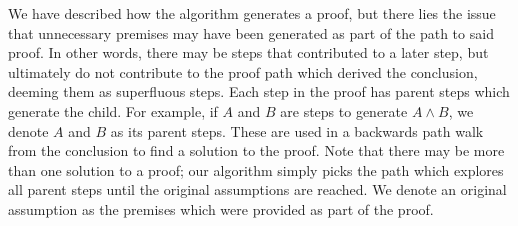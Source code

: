 \documentclass[ms]{uncgdissertationexp2}
\theoremstyle{plain}
\theoremstyle{definition}
\theoremstyle{remark}
\begin{document}
We have described how the algorithm generates a proof, but there lies the issue that unnecessary premises may have been generated as part of the path to said proof. In other words, there may be steps that contributed to a later step, but ultimately do not contribute to the proof path which derived the conclusion, deeming them as superfluous steps. Each step in the proof has parent steps which generate the child. For example, if $A$ and $B$ are steps to generate $A \land B$, we denote $A$ and $B$ as its parent steps. These are used in a backwards path walk from the conclusion to find a solution to the proof. Note that there may be more than one solution to a proof; our algorithm simply picks the path which explores all parent steps until the original assumptions are reached. We denote an original assumption as the premises which were provided as part of the proof.
\end{document}
